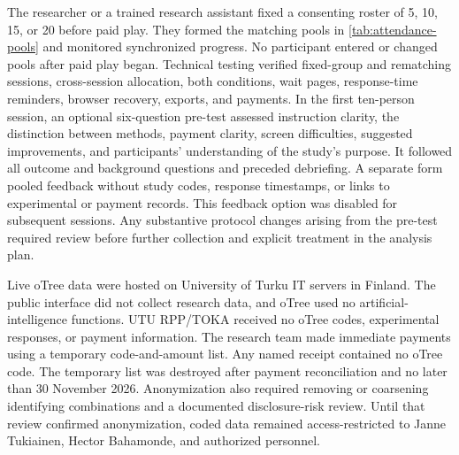 \documentclass[11pt]{article}
\begin{document}
The researcher or a trained research assistant fixed a consenting roster of 5, 10, 15, or 20 before paid play. They formed the matching pools in \autoref{tab:attendance-pools} and monitored synchronized progress. No participant entered or changed pools after paid play began. Technical testing verified fixed-group and rematching sessions, cross-session allocation, both conditions, wait pages, response-time reminders, browser recovery, exports, and payments. In the first ten-person session, an optional six-question pre-test assessed instruction clarity, the distinction between methods, payment clarity, screen difficulties, suggested improvements, and participants' understanding of the study's purpose. It followed all outcome and background questions and preceded debriefing. A separate form pooled feedback without study codes, response timestamps, or links to experimental or payment records. This feedback option was disabled for subsequent sessions. Any substantive protocol changes arising from the pre-test required review before further collection and explicit treatment in the analysis plan.

Live oTree data were hosted on University of Turku IT servers in Finland. The public interface did not collect research data, and oTree used no artificial-intelligence functions. UTU RPP/TOKA received no oTree codes, experimental responses, or payment information. The research team made immediate payments using a temporary code-and-amount list. Any named receipt contained no oTree code. The temporary list was destroyed after payment reconciliation and no later than 30 November 2026. Anonymization also required removing or coarsening identifying combinations and a documented disclosure-risk review. Until that review confirmed anonymization, coded data remained access-restricted to Janne Tukiainen, Hector Bahamonde, and authorized personnel.
\end{document}
